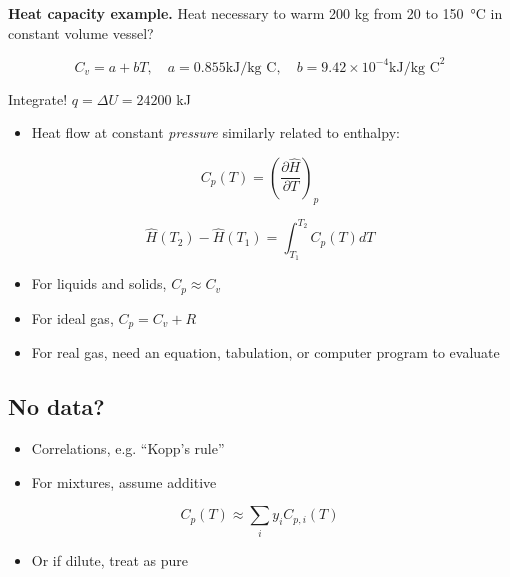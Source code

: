 \documentclass[11pt]{article}
\begin{document}
\begin{framed}
\noindent \textbf{Heat capacity example.}  Heat necessary to warm 200 kg  from 20 to \SI{150}{\celsius} in constant volume vessel?

\[ C_{v} = a + b T, \quad a = 0.855 \text{kJ/kg C}, \quad b = 9.42\times 10^{-4} \text{kJ/kg C}^{2}\]

Integrate!  \(q = \Delta U = 24200\) kJ
\end{framed}

\begin{itemize}
\item Heat flow at constant \emph{pressure} similarly related to enthalpy:
\end{itemize}

\[ C_{p}(T) = \left ( \frac{\partial\hat{H}}{\partial T} \right )_{p} \]

\[ \hat{H}(T_{2}) - \hat{H}(T_{1}) = \int_{T_{1}}^{T_{2}}C_{p}(T) dT \]

\begin{itemize}
\item For liquids and solids, \(C_{p} \approx C_{v}\)
\item For ideal gas, \(C_{p} = C_{v} + R\)
\item For real gas, need an equation, tabulation, or computer program to evaluate
\end{itemize}

\subsection{No data?}
\label{sec-10-4}
\begin{itemize}
\item Correlations, e.g. ``Kopp's rule''
\item For mixtures, assume additive
\end{itemize}

\[ C_{p}(T) \approx \sum_{i} y_{i} C_{p,i}(T) \]

\begin{itemize}
\item Or if dilute, treat as pure
\end{itemize}
\end{document}
